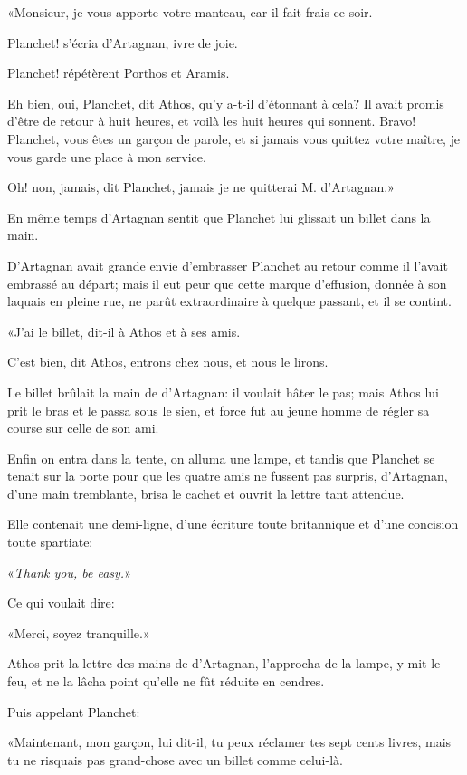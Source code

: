 «Monsieur, je vous apporte votre manteau, car il fait frais ce soir. 

\speak  Planchet! s'écria d'Artagnan, ivre de joie. 

\speak  Planchet! répétèrent Porthos et Aramis. 

\speak  Eh bien, oui, Planchet, dit Athos, qu'y a-t-il d'étonnant à cela? Il avait promis d'être de retour à huit heures, et voilà les huit heures qui sonnent. Bravo! Planchet, vous êtes un garçon de parole, et si jamais vous quittez votre maître, je vous garde une place à mon service. 

\speak  Oh! non, jamais, dit Planchet, jamais je ne quitterai M. d'Artagnan.» 

En même temps d'Artagnan sentit que Planchet lui glissait un billet dans la main. 

D'Artagnan avait grande envie d'embrasser Planchet au retour comme il l'avait embrassé au départ; mais il eut peur que cette marque d'effusion, donnée à son laquais en pleine rue, ne parût extraordinaire à quelque passant, et il se contint. 

«J'ai le billet, dit-il à Athos et à ses amis. 

\speak  C'est bien, dit Athos, entrons chez nous, et nous le lirons. 

Le billet brûlait la main de d'Artagnan: il voulait hâter le pas; mais Athos lui prit le bras et le passa sous le sien, et force fut au jeune homme de régler sa course sur celle de son ami. 

Enfin on entra dans la tente, on alluma une lampe, et tandis que Planchet se tenait sur la porte pour que les quatre amis ne fussent pas surpris, d'Artagnan, d'une main tremblante, brisa le cachet et ouvrit la lettre tant attendue. 

Elle contenait une demi-ligne, d'une écriture toute britannique et d'une concision toute spartiate: 

«\textit{Thank you, be easy.}» 

Ce qui voulait dire: 

«Merci, soyez tranquille.» 

Athos prit la lettre des mains de d'Artagnan, l'approcha de la lampe, y mit le feu, et ne la lâcha point qu'elle ne fût réduite en cendres. 

Puis appelant Planchet: 

«Maintenant, mon garçon, lui dit-il, tu peux réclamer tes sept cents livres, mais tu ne risquais pas grand-chose avec un billet comme celui-là. 

